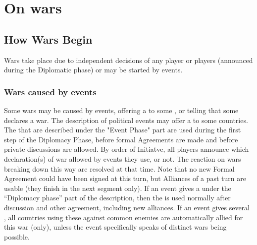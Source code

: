 
\section{On wars}




\subsection{How Wars Begin}

Wars take place due to independent decisions of any player or players
(announced during the Diplomatic phase) or may be started by events.


\subsubsection{Wars caused by events}
\aparag Some wars may be caused by events, offering a \CB to some \MAJ, or
telling that some \MIN declares a war.
\bparag The description of political events may offer a \CB to some
countries. The \CB that are described under the "Event Phase" part are used
during the first step of the Diplomacy Phase, before formal Agreements are
made and before private discussions are allowed. By order of Initiatve, all
players announce which declaration(s) of war allowed by events they use, or
not.
\bparag The reaction on wars breaking down this way are resolved at that
time. Note that no new Formal Agreement could have been signed at this turn,
but Alliances of a past turn are usable (they finish in the next segment
only).
\bparag If an event gives a \CB under the ``Diplomacy phase'' part of the
description, then the \CB is used normally after discussion and other
agreement, including new alliances.
\bparag If an event gives several \CB, all countries using these \CB against
common enemies are automatically allied for this war (only), unless the event
specifically speaks of distinct wars being possible.


